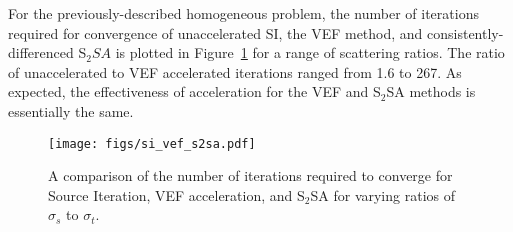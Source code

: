 

For the previously-described homogeneous problem, the number of iterations required for convergence of unaccelerated SI, the VEF method, and consistently-differenced S$_2SA$ is plotted in Figure~\ref{fig:si_vef_s2sa} for a range of scattering ratios. The ratio of unaccelerated to VEF accelerated iterations ranged from 1.6 to 267.  As expected, the effectiveness of acceleration for the VEF and S$_2$SA methods is essentially the same. 

	\begin{figure}[htb]
		\centering
		\texttt{[image: figs/si\_vef\_s2sa.pdf]} 
		\caption{A comparison of the number of iterations required to converge for Source Iteration, VEF acceleration, and S$_2$SA for varying ratios of $\sigma_s$ to $\sigma_t$. } 
		\label{fig:si_vef_s2sa}
	\end{figure}

